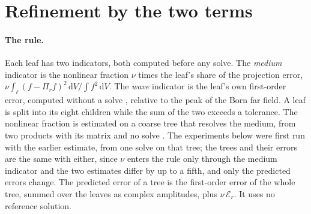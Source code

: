 \documentclass[11pt,a4paper]{article}
\newcommand{\cE}{\mathcal{E}}
\newcommand{\dd}{\mathrm{d}}
\begin{document}
\section{Refinement by the two terms}\label{sec:refine}

\paragraph{The rule.} Each leaf has two indicators, both computed before any solve. The \emph{medium}
indicator is the nonlinear fraction $\nu$ times the leaf's share of the projection error,
$\nu\int_\ell(f-\Pi_rf)^2\,\dd V/\int f^2\,\dd V$. The \emph{wave} indicator is the leaf's own
first-order error, computed without a solve \citep{NestorError2026}, relative to the peak of the Born far field. A leaf is split into
its eight children while the sum of the two exceeds a tolerance. The nonlinear fraction is estimated on a
coarse tree that resolves the medium, from two products with its matrix and no
solve \citep{NestorError2026}. The experiments below were first run with the earlier estimate, from one solve on
that tree; the trees and their errors are the same with either, since $\nu$ enters the rule only through
the medium indicator and the two estimates differ by up to a fifth, and only the predicted errors
change. The predicted error of a tree is the first-order error of the whole tree, summed over the leaves
as complex amplitudes, plus $\nu\,\cE_r$. It uses no reference solution.
\end{document}

